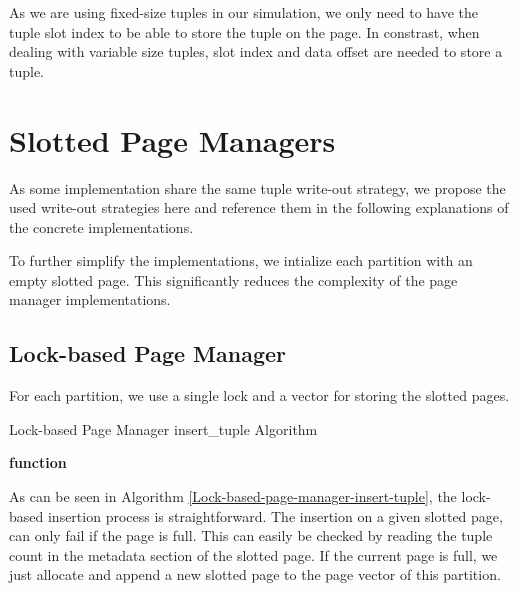 As we are using fixed-size tuples in our simulation, we only need to have the tuple slot index to be able to store the tuple on the page.
In constrast, when dealing with variable size tuples, slot index and data offset are needed to store a tuple.

\section{Slotted Page Managers}\label{section-slotted-page-managers}
As some implementation share the same tuple write-out strategy, we propose the used write-out strategies here and reference them in the following explanations of the concrete implementations.

To further simplify the implementations, we intialize each partition with an empty slotted page.
This significantly reduces the complexity of the page manager implementations.

\subsection{Lock-based Page Manager}
For each partition, we use a single lock and a vector for storing the slotted pages.
\begin{algorithm}[h]
  \caption{Lock-based Page Manager insert\_tuple Algorithm}\label{Lock-based-page-manager-insert-tuple}


  \textbf{function} \end{algorithm} As can be seen in Algorithm \ref{Lock-based-page-manager-insert-tuple}, the lock-based insertion process is straightforward.
The insertion on a given slotted page, can only fail if the page is full.
This can easily be checked by reading the tuple count in the metadata section of the slotted page.
If the current page is full, we just allocate and append a new slotted page to the page vector of this partition.

